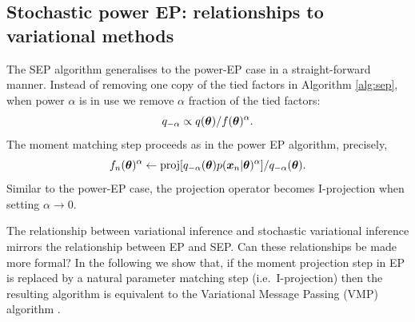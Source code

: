 \subsection{Stochastic power EP: relationships to variational methods}
The SEP algorithm generalises to the power-EP case in a straight-forward manner. Instead of removing one copy of the tied factors in Algorithm \ref{alg:sep}, when power $\alpha$ is in use we remove $\alpha$ fraction of the tied factors:
$$q_{-\alpha} \propto q(\bm{\theta}) / f(\bm{\theta})^{\alpha}.$$
The moment matching step proceeds as in the power EP algorithm, precisely, 
$$f_n(\bm{\theta})^{\alpha} \leftarrow \mathrm{proj}[ q_{-\alpha}(\bm{\theta}) p(\bm{x}_n | \bm{\theta})^{\alpha} ] / q_{-\alpha}(\bm{\theta}) .$$
Similar to the power-EP case, the projection operator becomes I-projection when setting $\alpha \rightarrow 0$.

%
The relationship between variational inference and stochastic variational inference \citep{hoffman:svi2013} mirrors the relationship between EP and SEP. 
%
Can these relationships be made more formal? In the following we show that, if the moment projection step in EP is replaced by a natural parameter matching step (i.e.~I-projection) then the resulting algorithm is equivalent to the Variational Message Passing (VMP) algorithm \citep{winn:vmp2005, minka:divergence2005}. 

